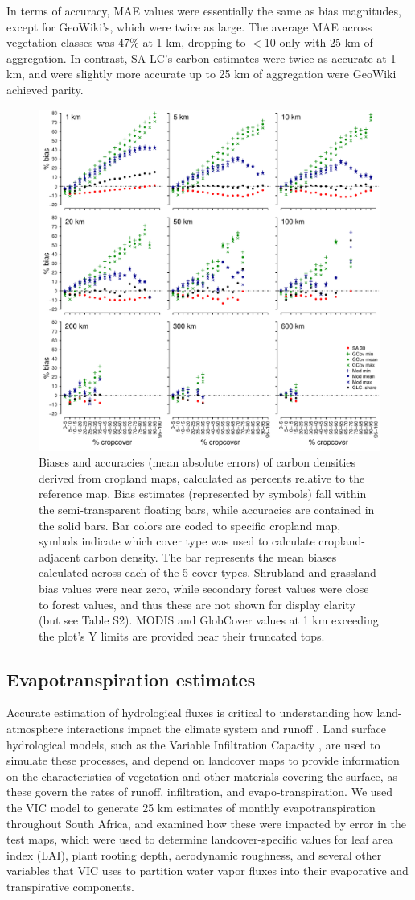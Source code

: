 \documentclass{pnastwo}
\begin{document}
\begin{article}
In terms of accuracy, MAE values were essentially the same as bias magnitudes, except for GeoWiki's, which were twice as large. The average MAE across vegetation classes was 47\% at 1 km, dropping to $<$10 only with 25 km of aggregation. In contrast, SA-LC's carbon estimates were twice as accurate at 1 km, and were slightly more accurate up to 25 km of aggregation were GeoWiki achieved parity.  

\begin{figure}[!h]
\centerline{\includegraphics[width=.5\textwidth]{figures/figure3.pdf}}
\caption{Biases and accuracies (mean absolute errors) of carbon densities derived from cropland maps, calculated as percents relative to the reference map. Bias estimates (represented by symbols) fall within the semi-transparent floating bars, while accuracies are contained in the solid bars. Bar colors are coded to specific cropland map, symbols indicate which cover type was used to calculate cropland-adjacent carbon density. The bar represents the mean biases calculated across each of the 5 cover types. Shrubland and grassland bias values were near zero, while secondary forest values were close to forest values, and thus these are not shown for display clarity (but see Table S2). MODIS and GlobCover values at 1 km exceeding the plot's Y limits are provided near their truncated tops.}
\label{afoto}
\end{figure}

\subsection{Evapotranspiration estimates}
Accurate estimation of hydrological fluxes is critical to understanding how land-atmosphere interactions impact the climate system and runoff \cite{liang_simple_1994}. Land surface hydrological models, such as the Variable Infiltration Capacity \cite{liang_simple_1994}, are used to simulate these processes, and depend on landcover maps to provide information on the characteristics of vegetation and other materials covering the surface, as these govern the rates of runoff, infiltration, and evapo-transpiration. We used the VIC model to generate 25 km estimates of monthly evapotranspiration throughout South Africa, and examined how these were impacted by error in the test maps, which were used to determine landcover-specific values for leaf area index (LAI), plant rooting depth, aerodynamic roughness, and several other variables that VIC uses to partition water vapor fluxes into their evaporative and transpirative components. 


\end{article}
\end{document}
